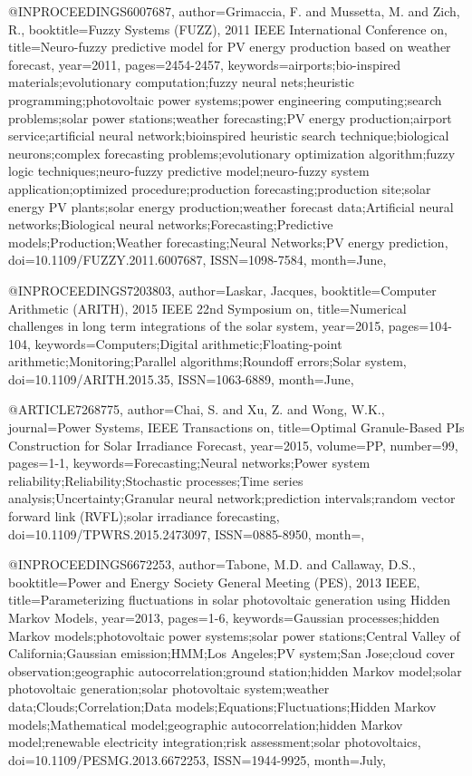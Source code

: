 {@INPROCEEDINGS{6007687, 
author={Grimaccia, F. and Mussetta, M. and Zich, R.}, 
booktitle={Fuzzy Systems (FUZZ), 2011 IEEE International Conference on}, 
title={Neuro-fuzzy predictive model for PV energy production based on weather forecast}, 
year={2011}, 
pages={2454-2457}, 
keywords={airports;bio-inspired materials;evolutionary computation;fuzzy neural nets;heuristic programming;photovoltaic power systems;power engineering computing;search problems;solar power stations;weather forecasting;PV energy production;airport service;artificial neural network;bioinspired heuristic search technique;biological neurons;complex forecasting problems;evolutionary optimization algorithm;fuzzy logic techniques;neuro-fuzzy predictive model;neuro-fuzzy system application;optimized procedure;production forecasting;production site;solar energy PV plants;solar energy production;weather forecast data;Artificial neural networks;Biological neural networks;Forecasting;Predictive models;Production;Weather forecasting;Neural Networks;PV energy prediction}, 
doi={10.1109/FUZZY.2011.6007687}, 
ISSN={1098-7584}, 
month={June},}

@INPROCEEDINGS{7203803, 
author={Laskar, Jacques}, 
booktitle={Computer Arithmetic (ARITH), 2015 IEEE 22nd Symposium on}, 
title={Numerical challenges in long term integrations of the solar system}, 
year={2015}, 
pages={104-104}, 
keywords={Computers;Digital arithmetic;Floating-point arithmetic;Monitoring;Parallel algorithms;Roundoff errors;Solar system}, 
doi={10.1109/ARITH.2015.35}, 
ISSN={1063-6889}, 
month={June},}

@ARTICLE{7268775, 
author={Chai, S. and Xu, Z. and Wong, W.K.}, 
journal={Power Systems, IEEE Transactions on}, 
title={Optimal Granule-Based PIs Construction for Solar Irradiance Forecast}, 
year={2015}, 
volume={PP}, 
number={99}, 
pages={1-1}, 
keywords={Forecasting;Neural networks;Power system reliability;Reliability;Stochastic processes;Time series analysis;Uncertainty;Granular neural network;prediction intervals;random vector forward link (RVFL);solar irradiance forecasting}, 
doi={10.1109/TPWRS.2015.2473097}, 
ISSN={0885-8950}, 
month={},}

@INPROCEEDINGS{6672253, 
author={Tabone, M.D. and Callaway, D.S.}, 
booktitle={Power and Energy Society General Meeting (PES), 2013 IEEE}, 
title={Parameterizing fluctuations in solar photovoltaic generation using Hidden Markov Models}, 
year={2013}, 
pages={1-6}, 
keywords={Gaussian processes;hidden Markov models;photovoltaic power systems;solar power stations;Central Valley of California;Gaussian emission;HMM;Los Angeles;PV system;San Jose;cloud cover observation;geographic autocorrelation;ground station;hidden Markov model;solar photovoltaic generation;solar photovoltaic system;weather data;Clouds;Correlation;Data models;Equations;Fluctuations;Hidden Markov models;Mathematical model;geographic autocorrelation;hidden Markov model;renewable electricity integration;risk assessment;solar photovoltaics}, 
doi={10.1109/PESMG.2013.6672253}, 
ISSN={1944-9925}, 
month={July},}

}

